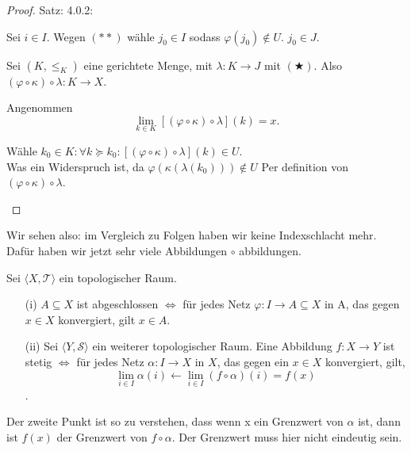 \begin{proof}{Satz: 4.0.2:}
\begin{itemize}
        Sei $i \in I$.
        Wegen $(**)$ wähle $j_0 \in I$ 
        sodass $\varphi(j_0) \notin U$. 
        $j_0 \in J$.

        Sei $(K, \le_K)$ eine gerichtete Menge, mit 
        $\lambda : K \to J$ mit $(\bigstar)$.
        Also $(\varphi \circ \kappa) \circ \lambda : K \to X$.

        Angenommen 
        $$
        \lim_{k \in K} [(\varphi \circ \kappa) \circ \lambda](k) = x.
        $$

        Wähle $k_0 \in K : \forall k \succeq k_0 : [(\varphi \circ \kappa) \circ \lambda](k) \in U.$ \\
        Was ein Widerspruch ist, da $\varphi(\kappa(\lambda(k_0))) \notin U$
        Per definition von $(\varphi \circ \kappa) \circ \lambda$.

    \end{itemize}
\end{proof}

Wir sehen also: im Vergleich zu Folgen haben wir keine Indexschlacht
mehr. 
Dafür haben wir jetzt sehr viele Abbildungen $\circ$ abbildungen.

\thm{}
{
    Sei $\langle X, \mathcal{T} \rangle$ ein topologischer Raum.
    \begin{itemize}
        \item[(i)] $A \subseteq X$ ist abgeschlossen $\Leftrightarrow$
        für jedes Netz $\varphi : I \to A \subseteq X$  in A, 
        das gegen $x \in X$ konvergiert, gilt $x \in A$.
        \item[(ii)] Sei $\langle Y, \mathcal{S} \rangle$ ein weiterer topologischer Raum.
        Eine Abbildung $f : X \to Y$ ist stetig $\Leftrightarrow$
        für jedes Netz $\alpha : I \to X$ in $X$, das gegen ein $x \in X$ konvergiert,
        gilt, 
        $$
        \lim_{i \in I} \alpha(i) 
        \leftarrow \lim_{i \in I} (f \circ \alpha)(i) = f(x)
        $$.
    \end{itemize}
}

Der zweite Punkt ist so zu verstehen, dass wenn x ein Grenzwert von $\alpha$ ist,
dann ist $f(x)$ der Grenzwert von $f \circ \alpha$.
Der Grenzwert muss hier nicht eindeutig sein.

